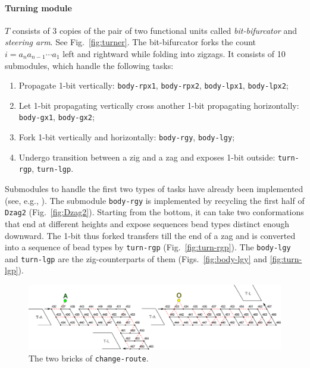 \documentclass[runningheads]{llncs}
\begin{document}
\paragraph{Turning module} $T$ consists of 3 copies of the pair of two functional units called \textit{bit-bifurcator} and \textit{steering arm}. 
See Fig.~\ref{fig:turner}. 
The bit-bifurcator forks the count $i = a_n a_{n-1} \cdots a_1$ left and rightward while folding into zigzags. 
It consists of 10 submodules, which handle the following tasks: 
\begin{enumerate}[topsep=0in, itemsep=0in]
\item Propagate 1-bit vertically: {\tt body-rpx1}, {\tt body-rpx2}, {\tt body-lpx1}, {\tt body-lpx2}; 
\item Let 1-bit propagating vertically cross another 1-bit propagating horizontally: {\tt body-gx1}, {\tt body-gx2}; 
\item Fork 1-bit vertically and horizontally: {\tt body-rgy}, {\tt body-lgy}; 
\item Undergo transition between a zig and a zag and exposes 1-bit outside: {\tt turn-rgp}, {\tt turn-lgp}. 
\end{enumerate}
Submodules to handle the first two types of tasks have already been implemented (see, e.g., \cite{HaKiOtSe2016}). 
The submodule \texttt{body-rgy} is implemented by recycling the first half of \texttt{Dzag2} (Fig.~\ref{fig:Dzag2}). 
Starting from the bottom, it can take two conformations that end at different heights and expose sequences bead types distinct enough downward. 
The 1-bit thus forked transfers till the end of a zag and is converted into a sequence of bead types by \texttt{turn-rgp} (Fig.~\ref{fig:turn-rgp}). 
The \texttt{body-lgy} and \texttt{turn-lgp} are the zig-counterparts of them (Figs.~\ref{fig:body-lgy} and \ref{fig:turn-lgp}). 

\begin{figure}[tb]
\centering
\includegraphics[width=0.9\linewidth]{Figs/change-route.png}
\caption{The two bricks of \texttt{change-route}.}
\label{fig:change_route}
\end{figure}
\end{document}
